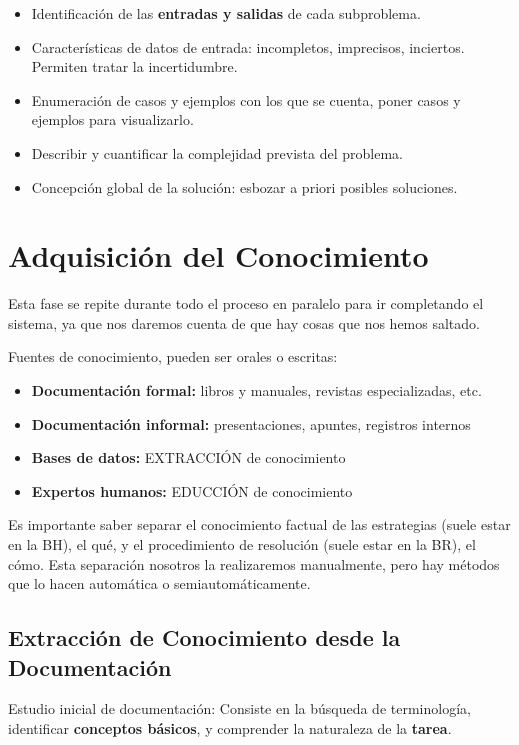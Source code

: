 \documentclass[12pt, twoside, openright]{report} %
\begin{document}
\begin{enumerate}
\begin{itemize}
		      \item Identificación de las \textbf{entradas y salidas} de cada subproblema.
		      \item Características de datos de entrada: incompletos, imprecisos, inciertos. Permiten tratar la incertidumbre.
		      \item Enumeración de casos y ejemplos con los que se cuenta, poner casos y ejemplos para visualizarlo.
		      \item Describir y cuantificar la complejidad prevista del problema.
		      \item Concepción global de la solución: esbozar a priori posibles soluciones.
	      \end{itemize}
\end{enumerate}

\section{Adquisición del Conocimiento}
Esta fase se repite durante todo el proceso en paralelo para ir completando el sistema, ya que nos daremos cuenta de que hay cosas que nos hemos saltado.

Fuentes de conocimiento, pueden ser orales o escritas:
\begin{itemize}
	\item \textbf{Documentación formal:} libros y manuales, revistas especializadas, etc.
	\item \textbf{Documentación informal:} presentaciones, apuntes, registros internos
	\item \textbf{Bases de datos:} EXTRACCIÓN de conocimiento
	\item \textbf{Expertos humanos:} EDUCCIÓN de conocimiento
\end{itemize}

Es importante saber separar el conocimiento factual de las estrategias (suele estar en la BH), el qué, y el procedimiento de resolución (suele estar en la BR), el cómo. Esta separación nosotros la realizaremos manualmente, pero hay métodos que lo hacen automática o semiautomáticamente.

\subsection{Extracción de Conocimiento desde la Documentación}
Estudio inicial de documentación: Consiste en la búsqueda de terminología, identificar \textbf{conceptos básicos}, y comprender la naturaleza de la \textbf{tarea}.
\end{document}
